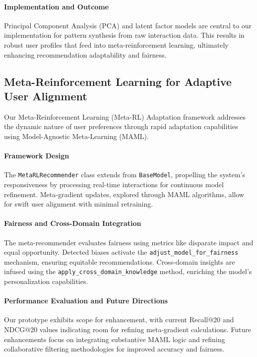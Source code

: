 \paragraph{Implementation and Outcome}
Principal Component Analysis (PCA) and latent factor models are central to our implementation for pattern synthesis from raw interaction data. This results in robust user profiles that feed into meta-reinforcement learning, ultimately enhancing recommendation adaptability and fairness.

\subsection{Meta-Reinforcement Learning for Adaptive User Alignment}

Our Meta-Reinforcement Learning (Meta-RL) Adaptation framework addresses the dynamic nature of user preferences through rapid adaptation capabilities using Model-Agnostic Meta-Learning (MAML).

\paragraph{Framework Design}
The \texttt{MetaRLRecommender} class extends from \texttt{BaseModel}, propelling the system's responsiveness by processing real-time interactions for continuous model refinement. Meta-gradient updates, explored through MAML algorithms, allow for swift user alignment with minimal retraining.

\paragraph{Fairness and Cross-Domain Integration}
The meta-recommender evaluates fairness using metrics like disparate impact and equal opportunity. Detected biases activate the \texttt{adjust\_model\_for\_fairness} mechanism, ensuring equitable recommendations. Cross-domain insights are infused using the \texttt{apply\_cross\_domain\_knowledge} method, enriching the model's personalization capabilities.

\paragraph{Performance Evaluation and Future Directions}
Our prototype exhibits scope for enhancement, with current Recall@20 and NDCG@20 values indicating room for refining meta-gradient calculations. Future enhancements focus on integrating substantive MAML logic and refining collaborative filtering methodologies for improved accuracy and fairness.

